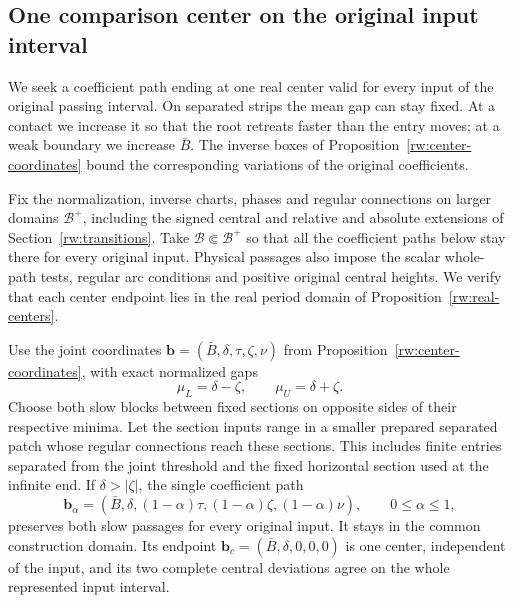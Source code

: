 \subsection{One comparison center on the original input interval}
\label{rw:comparison-domains}

We seek a coefficient path ending at one real center valid for every
input of the original passing interval. On separated strips the mean
gap can stay fixed. At a contact we increase it so that the root retreats
faster than the entry moves; at a weak boundary we increase $\bar B$.
The inverse boxes of Proposition~\ref{rw:center-coordinates} bound
the corresponding variations of the original coefficients.

Fix the normalization, inverse charts, phases and regular connections
on larger domains $\mathcal B^+$, including the signed central and
relative and absolute extensions of Section~\ref{rw:transitions}.
Take $\mathcal B\Subset\mathcal B^+$ so that all the coefficient
paths below stay there for every original input. Physical passages
also impose the scalar whole-path tests, regular arc conditions and
positive original central heights. We verify that each center endpoint
lies in the real period domain of Proposition~\ref{rw:real-centers}.

\begin{proposition}
\label{rw:domains:separated}
Use the joint coordinates
$\mathbf b=(\bar B,\delta,\tau,\zeta,\nu)$ from
Proposition~\ref{rw:center-coordinates}, with exact normalized gaps
\[
 \mu_L=\delta-\zeta,\qquad \mu_U=\delta+\zeta.
\]
Choose both slow blocks between fixed sections on opposite sides of
their respective minima. Let the section inputs range in a smaller
prepared separated patch whose regular connections reach these
sections. This includes finite entries separated from the joint
threshold and the fixed horizontal section used at the infinite end.
If $\delta>|\zeta|$, the single coefficient path
\begin{equation}\label{rw:domains:separated-path}
 \mathbf b_\alpha=
 (\bar B,\delta,(1-\alpha)\tau,(1-\alpha)\zeta,
                      (1-\alpha)\nu),\qquad0\le\alpha\le1,
\end{equation}
preserves both slow passages for every original input. It stays in
the common construction domain. Its endpoint
$\mathbf b_c=(\bar B,\delta,0,0,0)$ is one center, independent of
the input, and its two complete central deviations agree on the
whole represented input interval.
\end{proposition}

